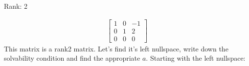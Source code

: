 \documentclass[letterpaper,10pt,english]{jupyterBook}
\begin{document}
\begin{sphinxVerbatim}[commandchars=\\\{\}]
  

  \PYG{p}{[}
    \PYG{p}{[}  \PYG{p}{]}
    \PYG{p}{[}  \PYG{p}{]}
    \PYG{p}{[}  \PYG{p}{]}
\PYG{p}{]}

  \PYG{p}{[}
      \PYG{p}{]}

\PYG{p}{[}\PYG{p}{]}
\end{sphinxVerbatim}

\begin{sphinxVerbatim}[commandchars=\\\{\}]
Rank: 2
\end{sphinxVerbatim}
\begin{equation*}
\begin{split}\displaystyle \left[\begin{matrix}1 & 0 & -1\\0 & 1 & 2\\0 & 0 & 0\end{matrix}\right]\end{split}
\end{equation*}
\sphinxAtStartPar
This matrix is a rank\sphinxhyphen{}2 matrix. Let’s find it’s left nullspace, write down the solvability condition and find the appropriate \(a\).
Starting with the left null\sphinxhyphen{}space:
\end{document}
